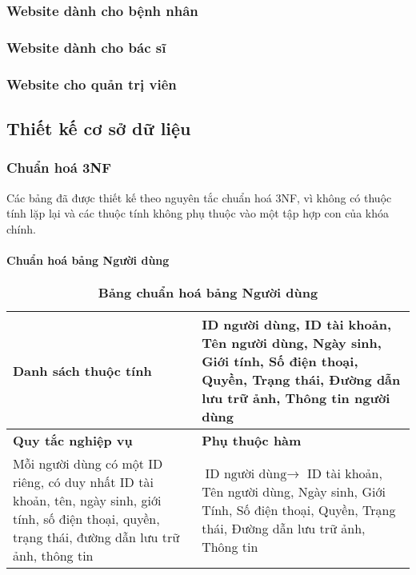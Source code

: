 \subsubsection{Website dành cho bệnh nhân}



\subsubsection{Website dành cho bác sĩ}


\subsubsection{Website cho quản trị viên}


\subsection{Thiết kế cơ sở dữ liệu}

\subsubsection{Chuẩn hoá 3NF}
Các bảng đã được thiết kế theo nguyên tắc chuẩn hoá 3NF, vì không có thuộc tính lặp lại và các thuộc tính không phụ thuộc vào một tập hợp con của khóa chính.

\paragraph{Chuẩn hoá bảng Người dùng}
\mbox{}
\begin{table}[H]
  \caption{\bfseries \fontsize{12pt}{0pt}\selectfont Bảng chuẩn hoá bảng Người dùng}
  \centering
  \begin{tabularx}{0.9\textwidth}{|X|X|}
    \hline
    \textbf{Danh sách thuộc tính} & ID người dùng, ID tài khoản, Tên người dùng, Ngày sinh, Giới tính, Số điện thoại, Quyền, Trạng thái, Đường dẫn lưu trữ ảnh, Thông tin người dùng \\
    \hline
    \textbf{Quy tắc nghiệp vụ} & \textbf{Phụ thuộc hàm} \\
    \hline
    Mỗi người dùng có một ID riêng, có duy nhất ID tài khoản, tên, ngày sinh, giới tính, số điện thoại, quyền,
    trạng thái, đường dẫn lưu trữ ảnh, thông tin & \parbox[t]{\linewidth}{$\text{ID người dùng} \rightarrow$ ID tài khoản, Tên người dùng, Ngày sinh, Giới Tính, Số điện thoại, Quyền, Trạng thái, Đường dẫn lưu trữ ảnh, Thông tin} \\
    \hline
     \\
     \\
    \hline
  \end{tabularx}
\end{table}

